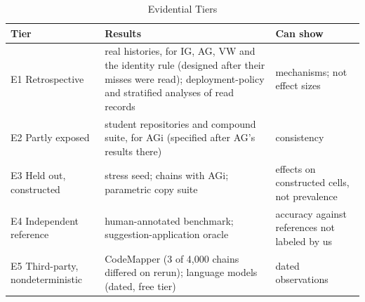 \begin{table}[t]
\caption{Evidential Tiers}\label{tab:evidence}
\centering\footnotesize
\setlength{\tabcolsep}{2.5pt}
\begin{tabular}{@{}p{}p{}p{}@{}}\toprule
Tier & Results & Can show \\ \midrule
E1 Retrospective & real histories, for IG, AG, VW and the identity rule (designed after their misses were read); deployment-policy and stratified analyses of read records & mechanisms; not effect sizes \\
E2 Partly exposed & student repositories and compound suite, for AGi (specified after AG's results there) & consistency \\
E3 Held out, constructed & stress seed; chains with AGi; parametric copy suite & effects on constructed cells, not prevalence \\
E4 Independent reference & human-annotated benchmark; suggestion-application oracle & accuracy against references not labeled by us \\
E5 Third-party, nondeterministic & CodeMapper (3 of 4,000 chains differed on rerun); language models (dated, free tier) & dated observations \\ \bottomrule
\end{tabular}
\end{table}
